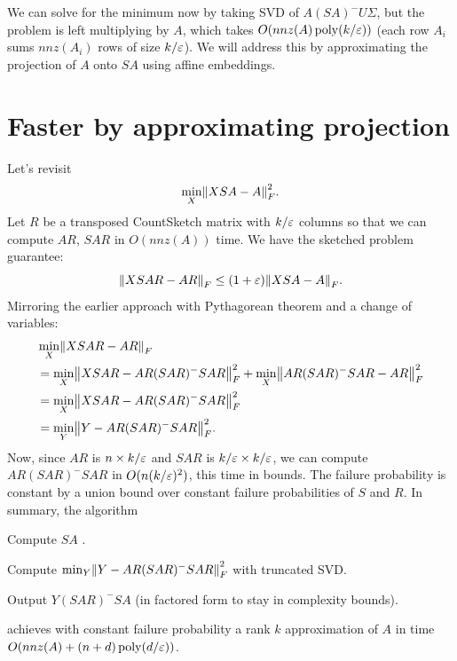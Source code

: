 \documentclass{article}
\begin{document}
We can solve for the minimum now by taking SVD of $A(SA)^- U\Sigma $, but the problem is left multiplying by $A$, which takes $O(nnz(A) \operatorname{poly}(k/\varepsilon ))$ (each row $A_i $ sums $nnz(A_i )$ rows of size $k/\varepsilon $). We will address this by approximating the projection of $A$ onto $SA$ using affine embeddings. 

\section{Faster by approximating projection}
Let's revisit 
\[
    \min _X \norm*{XSA - A}_{F} ^2. 
\]
Let $R$ be a transposed CountSketch matrix with $k/\varepsilon $ columns so that we can compute $AR$, $SAR$ in $O(nnz(A))$ time. We have the sketched problem guarantee: 
\[
    \norm*{XSAR - AR}_{F} \leq (1+\eps ) \norm*{XSA - A}_{F} . 
\]
Mirroring the earlier approach with Pythagorean theorem and a change of variables: 
\begin{align*}
    &\min _X \norm*{XSAR - AR}_{F} \\
    &=  \min _X \norm*{XSAR - AR(SAR)^- SAR}_{F} ^2  + \min _X \norm*{AR(SAR)^- SAR - AR}_{F}^2 \\
    &= \min _X \norm*{XSAR - AR(SAR)^- SAR}_{F} ^2\\
    &= \min _Y \norm*{Y - AR(SAR)^- SAR}_{F} ^2 . 
\end{align*}
Now, since $AR$ is $n \times k/\varepsilon $ and $SAR$ is $k/\varepsilon \times k/\varepsilon $, we can compute $AR(SAR)^- SAR$ in $O(n (k/\varepsilon )^2 )$, this time in bounds. The failure probability is constant by a union bound over constant failure probabilities of $S$ and $R$. In summary, the algorithm
\begin{enum}
    \item Compute $SA$ . 
    \item Compute $\min _Y \norm*{Y - AR(SAR)^- SAR}_{F} ^2$ with truncated SVD. 
    \item Output $Y(SAR)^- SA$ (in factored form to stay in complexity bounds). 
\end{enum}
achieves with constant failure probability a rank $k$ approximation of $A$ in time $O(nnz(A) + (n+d)\operatorname{poly}(d/\varepsilon ))$. 
\end{document}
